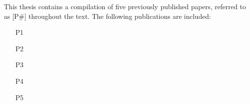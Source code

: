This thesis contains a compilation of five previously published papers, referred to as [P\#] throughout the text. The following publications are included:

\begin{itemize}
\item [P1]
\item [P2]
\item [P3]
\item [P4]
\item [P5]
\end{itemize}
